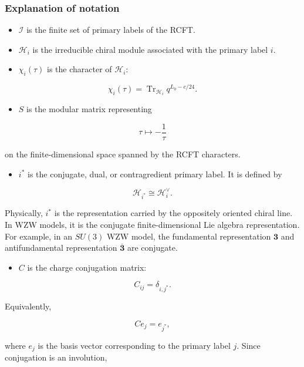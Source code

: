 \documentclass[
  10pt,
  a4paper,
  openany]{book}
\providecommand{\tightlist}{%
  \setlength{\itemsep}{0pt}\setlength{\parskip}{0pt}}
\begin{document}
\subsubsection{Explanation of notation}\label{explanation-of-notation}

\begin{itemize}
\item
  \(\mathcal I\) is the finite set of primary labels of the RCFT.
\item
  \(\mathcal H_i\) is the irreducible chiral module associated with the
  primary label \(i\).
\item
  \(\chi_i(\tau)\) is the character of \(\mathcal H_i\):
\end{itemize}

\[
\chi_i(\tau)
=
\operatorname{Tr}_{\mathcal H_i}
q^{L_0-c/24}.
\]

\begin{itemize}
\tightlist
\item
  \(S\) is the modular matrix representing
\end{itemize}

\[
\tau \mapsto -\frac{1}{\tau}
\]

on the finite-dimensional space spanned by the RCFT characters.

\begin{itemize}
\tightlist
\item
  \(i^*\) is the conjugate, dual, or contragredient primary label. It is
  defined by
\end{itemize}

\[
\mathcal H_{i^*}
\cong
\mathcal H_i^\vee.
\]

Physically, \(i^*\) is the representation carried by the oppositely
oriented chiral line. In WZW models, it is the conjugate
finite-dimensional Lie algebra representation. For example, in an
\(SU(3)\) WZW model, the fundamental representation \(\mathbf 3\) and
antifundamental representation \(\overline{\mathbf 3}\) are conjugate.

\begin{itemize}
\tightlist
\item
  \(C\) is the charge conjugation matrix:
\end{itemize}

\[
C_{ij}
=
\delta_{i,j^*}.
\]

Equivalently,

\[
C e_j = e_{j^*},
\]

where \(e_j\) is the basis vector corresponding to the primary label
\(j\). Since conjugation is an involution,
\end{document}
